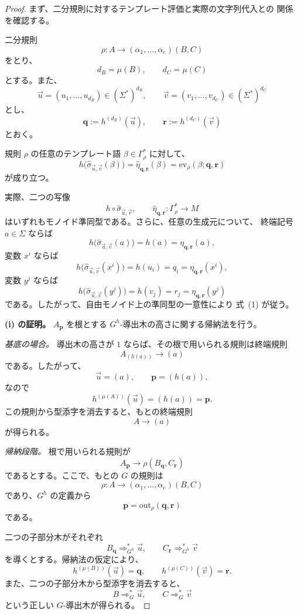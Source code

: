 \documentclass[11pt,a4paper]{ltjsarticle}
\theoremstyle{remark}
\newcommand{\out}{\mathrm{out}}
\newcommand{\ev}{\mathrm{ev}}
\newcommand{\tuple}[1]{\vec{#1}}
\begin{document}
\begin{proof}
まず、二分規則に対するテンプレート評価と実際の文字列代入との
関係を確認する。

二分規則
\[
  \rho\colon
  A\to(\alpha_1,\ldots,\alpha_e)(B,C)
\]
をとり、
\[
  d_B=\mu(B),
  \qquad
  d_C=\mu(C)
\]
とする。また、
\[
  \tuple u=(u_1,\ldots,u_{d_B})
  \in(\Sigma^*)^{d_B},
  \qquad
  \tuple v=(v_1,\ldots,v_{d_C})
  \in(\Sigma^*)^{d_C}
\]
とし、
\[
  \mathbf q:=h^{(d_B)}(\tuple u),
  \qquad
  \mathbf r:=h^{(d_C)}(\tuple v)
\]
とおく。

規則 \(\rho\) の任意のテンプレート語
\(\beta\in\Gamma_\rho^*\) に対して、
\[
  h\bigl(
    \widehat{\sigma}_{\tuple u,\tuple v}(\beta)
  \bigr)
  =
  \widehat{\eta}_{\mathbf q,\mathbf r}(\beta)
  =
  \ev_\rho(\beta;\mathbf q,\mathbf r)
  \tag{1}
\]
が成り立つ。

実際、二つの写像
\[
  h\circ\widehat{\sigma}_{\tuple u,\tuple v},
  \qquad
  \widehat{\eta}_{\mathbf q,\mathbf r}
  \colon
  \Gamma_\rho^*\to M
\]
はいずれもモノイド準同型である。さらに、任意の生成元について、
終端記号 \(a\in\Sigma\) ならば
\[
  h\bigl(\widehat{\sigma}_{\tuple u,\tuple v}(a)\bigr)
  =
  h(a)
  =
  \eta_{\mathbf q,\mathbf r}(a),
\]
変数 \(x^i\) ならば
\[
  h\bigl(\widehat{\sigma}_{\tuple u,\tuple v}(x^i)\bigr)
  =
  h(u_i)
  =
  q_i
  =
  \eta_{\mathbf q,\mathbf r}(x^i),
\]
変数 \(y^j\) ならば
\[
  h\bigl(\widehat{\sigma}_{\tuple u,\tuple v}(y^j)\bigr)
  =
  h(v_j)
  =
  r_j
  =
  \eta_{\mathbf q,\mathbf r}(y^j)
\]
である。したがって、自由モノイド上の準同型の一意性により
式~\textup{(1)} が従う。

\medskip
\noindent
\textbf{(i) の証明。}
\(A_{\mathbf p}\) を根とする \(G^h\)-導出木の高さに関する帰納法を行う。

\smallskip
\noindent
\emph{基底の場合。}
導出木の高さが \(1\) ならば、その根で用いられる規則は終端規則
\[
  A_{(h(a))}\to(a)
\]
である。したがって、
\[
  \tuple u=(a),
  \qquad
  \mathbf p=(h(a)),
\]
なので
\[
  h^{(\mu(A))}(\tuple u)
  =
  (h(a))
  =
  \mathbf p.
\]
この規則から型添字を消去すると、もとの終端規則
\[
  A\to(a)
\]
が得られる。

\smallskip
\noindent
\emph{帰納段階。}
根で用いられる規則が
\[
  A_{\mathbf p}
  \to
  \rho(B_{\mathbf q},C_{\mathbf r})
  \tag{2}
\]
であるとする。ここで、もとの \(G\) の規則は
\[
  \rho\colon
  A\to(\alpha_1,\ldots,\alpha_e)(B,C)
\]
であり、\(G^h\) の定義から
\[
  \mathbf p=\out_\rho(\mathbf q,\mathbf r)
  \tag{3}
\]
である。

二つの子部分木がそれぞれ
\[
  B_{\mathbf q}\Rightarrow_{G^h}^*\tuple u,
  \qquad
  C_{\mathbf r}\Rightarrow_{G^h}^*\tuple v
\]
を導くとする。帰納法の仮定により、
\[
  h^{(\mu(B))}(\tuple u)=\mathbf q,
  \qquad
  h^{(\mu(C))}(\tuple v)=\mathbf r.
  \tag{4}
\]
また、二つの子部分木から型添字を消去すると、
\[
  B\Rightarrow_G^*\tuple u,
  \qquad
  C\Rightarrow_G^*\tuple v
\]
という正しい \(G\)-導出木が得られる。


\end{proof}
\end{document}
